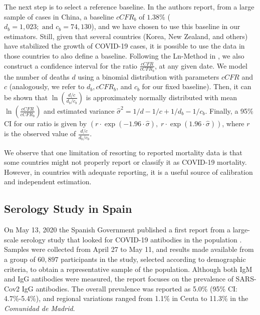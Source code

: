 \documentclass{article}
\newcommand{\af}[1]{{#1}}
\newcommand{\cb}[1]{{#1}}
\newcommand{\hh}[1]{{#1}}
\begin{document}
\cb{The next step is to select a reference baseline}. In \cite{Verity2020} the authors report, from a large sample of cases in China, a baseline $\textit{cCFR}_b$ of $1.38\%$ \hh{($d_b = 1,023; \mbox{ and } c_b = 74,130$)}, \cb{and we have chosen to use this baseline in our estimators.} Still, given that several countries (Korea, New Zealand, and others) have stabilized the growth of COVID-19 cases, it is possible to use the data in those countries to also define a baseline.
%
\hh{Following the Ln-Method in \cite{10.2307/2531405}, we also construct a confidence interval for the ratio $\frac{\textit{cCFR}}{\textit{cCFR}_b}$, at any given date. We model the number of deaths $d$ using a binomial distribution with parameters $\textit{cCFR}$ and $c$ (analogously, we refer to $d_b, \textit{cCFR}_b$, and $c_b$ for our fixed baseline). Then, it can be shown that $\ln \left( \frac{d/c}{d_b/c_b} \right) $ is approximately normally distributed with mean $\ln \left( \frac{\textit{cCFR}}{\textit{cCFR}_b} \right)$ and estimated variance $\hat{\sigma}^2=1/d-1/c+1/d_b-1/c_b$. Finally, a 95\% CI for our ratio is given by $\left( r \cdot \exp(-1.96 \cdot \hat \sigma ),\; r \cdot \exp(1.96 \cdot \hat \sigma ) \right)$, where $r$ is the observed value of $\frac{d/c}{d_b/c_b}$. }

We observe that one limitation of resorting to reported mortality data is that some countries might not properly report or classify it as COVID-19 mortality. However, in countries with adequate reporting, it is a useful source of calibration and independent estimation.



\subsection{Serology Study in Spain}

On May 13, 2020 the Spanish Government published a first report from a large-scale serology study that looked for COVID-19 antibodies in the population \cite{ENEcovid19}. Samples were collected from April 27 to May 11, and results made available from a group of $60,897$ participants in the study, selected according to demographic criteria, to obtain a representative sample of the population. Although both IgM and IgG antibodies were measured, the report focuses on the prevalence of  SARS-Cov2 IgG antibodies. The overall prevalence was reported as 5.0\% (95\% CI: 4.7\%-5.4\%), and regional variations ranged from 1.1\% in Ceuta to 11.3\% in the \emph{Comunidad de Madrid}.
\end{document}
